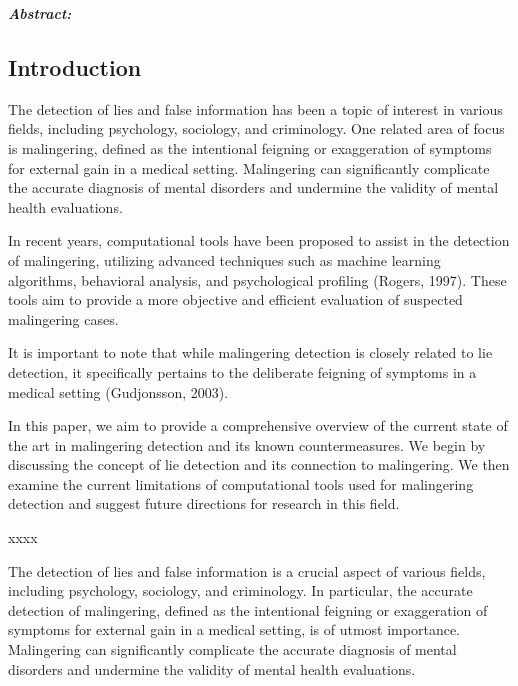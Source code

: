 \documentclass[onecolumn, compsoc,10pt]{IEEEtran}
\begin{document}
  
\maketitle  

{\bf \sffamily \fontsize{10}{12}\selectfont \noindent   
  {\normalfont \itshape Abstract:}

}
  
\vspace{10pt} 

\subsection*{Introduction}


The detection of lies and false information has been a topic of interest in various fields, including psychology, sociology, and criminology. One related area of focus is malingering, defined as the intentional feigning or exaggeration of symptoms for external gain in a medical setting. Malingering can significantly complicate the accurate diagnosis of mental disorders and undermine the validity of mental health evaluations.

In recent years, computational tools have been proposed to assist in the detection of malingering, utilizing advanced techniques such as machine learning algorithms, behavioral analysis, and psychological profiling (Rogers, 1997). These tools aim to provide a more objective and efficient evaluation of suspected malingering cases.

It is important to note that while malingering detection is closely related to lie detection, it specifically pertains to the deliberate feigning of symptoms in a medical setting (Gudjonsson, 2003).

In this paper, we aim to provide a comprehensive overview of the current state of the art in malingering detection and its known countermeasures. We begin by discussing the concept of lie detection and its connection to malingering. We then examine the current limitations of computational tools used for malingering detection and suggest future directions for research in this field.


xxxx




The detection of lies and false information is a crucial aspect of various fields, including psychology, sociology, and criminology. In particular, the accurate detection of malingering, defined as the intentional feigning or exaggeration of symptoms for external gain in a medical setting, is of utmost importance. Malingering can significantly complicate the accurate diagnosis of mental disorders and undermine the validity of mental health evaluations.
\end{document}

